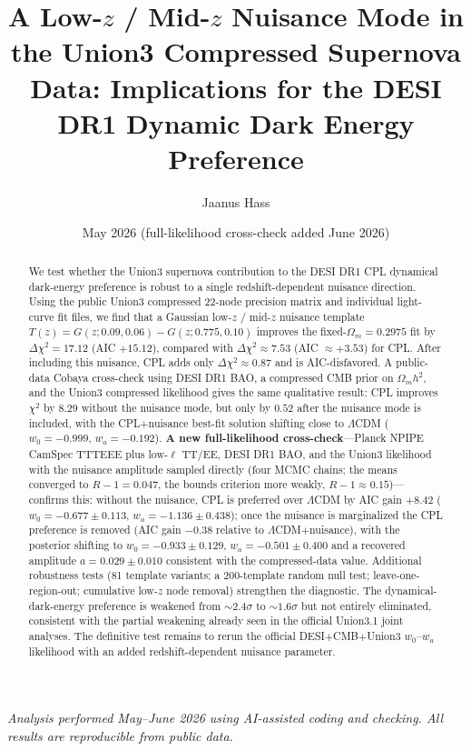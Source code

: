 \documentclass[11pt]{article}
\title{\bfseries A Low-$z$ / Mid-$z$ Nuisance Mode in the Union3 Compressed
Supernova Data: Implications for the DESI DR1 Dynamic Dark Energy Preference}
\author{Jaanus Hass}
\affil{Independent researcher, Saru, Estonia \\ \texttt{jaanush@hotmail.com}}
\date{May 2026 \quad(full-likelihood cross-check added June 2026)}
\begin{document}
\maketitle

\begin{center}
\small\itshape
Analysis performed May--June 2026 using AI-assisted coding and checking.
All results are reproducible from public data.
\end{center}

\begin{abstract}
\noindent
We test whether the Union3 supernova contribution to the DESI DR1 CPL dynamical
dark-energy preference is robust to a single redshift-dependent nuisance direction.
Using the public Union3 compressed 22-node precision matrix and individual
light-curve fit files, we find that a Gaussian low-$z$ / mid-$z$ nuisance template
$T(z)=G(z;0.09,0.06)-G(z;0.775,0.10)$ improves the fixed-$\Omega_m=0.2975$ fit by
$\Delta\chi^2=17.12$ (AIC $+15.12$), compared with $\Delta\chi^2\approx7.53$
(AIC $\approx+3.53$) for CPL. After including this nuisance, CPL adds only
$\Delta\chi^2\approx0.87$ and is AIC-disfavored.
A public-data Cobaya cross-check using DESI DR1 BAO, a compressed CMB prior on
$\Omega_m h^2$, and the Union3 compressed likelihood gives the same qualitative
result: CPL improves $\chi^2$ by $8.29$ without the nuisance mode, but only by
$0.52$ after the nuisance mode is included, with the CPL+nuisance best-fit solution shifting
close to $\Lambda$CDM ($w_0=-0.999$, $w_a=-0.192$).
\textbf{A new full-likelihood cross-check}---Planck NPIPE CamSpec TTTEEE plus
low-$\ell$ TT/EE, DESI DR1 BAO, and the Union3 likelihood with the nuisance amplitude
sampled directly (four MCMC chains; the means converged to $R-1=0.047$, the bounds criterion more weakly, $R-1\approx0.15$)---confirms this: without the nuisance,
CPL is preferred over $\Lambda$CDM by AIC gain $+8.42$ ($w_0=-0.677\pm0.113$,
$w_a=-1.136\pm0.438$); once the nuisance is marginalized the CPL preference is removed
(AIC gain $-0.38$ relative to $\Lambda$CDM$+$nuisance), with the posterior shifting to
$w_0=-0.933\pm0.129$, $w_a=-0.501\pm0.400$ and a recovered amplitude
$a=0.029\pm0.010$ consistent with the compressed-data value.
Additional robustness tests (81 template variants; a 200-template random null test;
leave-one-region-out; cumulative low-$z$ node removal) strengthen the diagnostic.
The dynamical-dark-energy preference is weakened from $\sim2.4\sigma$ to $\sim1.6\sigma$
but not entirely eliminated, consistent with the partial weakening already seen in the
official Union3.1 joint analyses. The definitive test remains to rerun the official
DESI$+$CMB$+$Union3 $w_0$--$w_a$ likelihood with an added redshift-dependent nuisance
parameter.
\end{abstract}
\end{document}
